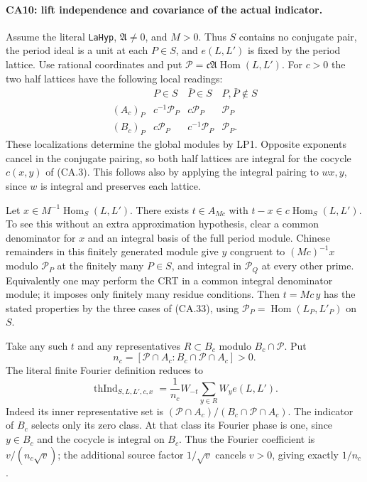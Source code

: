 \paragraph{CA10: lift independence and covariance of the actual indicator.}
Assume the literal \texttt{LaHyp}, $\mathfrak A\ne0$, and $M>0$.
Thus $S$ contains no conjugate pair, the period ideal is a unit at
each $P\in S$, and $e(L,L')$ is fixed by the period lattice.
Use rational coordinates and put
$\mathcal P=\mathfrak c\mathfrak A\operatorname{Hom}(L,L')$.
For $c>0$ the two half lattices have the following local readings:
\[
\begin{array}{c|ccc}
 &P\in S&\bar P\in S&P,\bar P\notin S\\ \hline
 (A_c)_P&c^{-1}\mathcal P_P&c\mathcal P_P&\mathcal P_P\\
 (B_c)_P&c\mathcal P_P&c^{-1}\mathcal P_P&\mathcal P_P.
\end{array}
 \tag{CA.33}
\]
These localizations determine the global modules by LP1. Opposite
exponents cancel in the conjugate pairing, so both half lattices
are integral for the cocycle $c(x,y)$ of (CA.3). This follows
also by applying the integral pairing to $wx,y$, since $w$ is
integral and preserves each lattice.

Let $x\in M^{-1}\operatorname{Hom}_S(L,L')$. There exists
$t\in A_{Mc}$ with $t-x\in c\operatorname{Hom}_S(L,L')$.
To see this without an extra approximation hypothesis, clear a
common denominator for $x$ and an integral basis of the full
period module. Chinese remainders in this finitely generated
module give $y$ congruent to $(Mc)^{-1}x$ modulo $\mathcal P_P$
at the finitely many $P\in S$, and integral in $\mathcal P_Q$
at every other prime. Equivalently one may perform the CRT in
a common integral denominator module; it imposes only finitely
many residue conditions. Then $t=Mc\,y$ has the stated properties
by the three cases of (CA.33), using
$\mathcal P_P=\operatorname{Hom}(L_P,L'_P)$ on $S$.

Take any such $t$ and any representatives
$R\subset B_c$ modulo $B_c\cap\mathcal P$. Put
\[
 n_c=[\mathcal P\cap A_c:B_c\cap\mathcal P\cap A_c]>0.
\]
The literal finite Fourier definition reduces to
\[
 \operatorname{thInd}_{S,L,L',c,x}
    =\frac1{n_c}W_{-t}\sum_{y\in R}W_y e(L,L').
 \tag{CA.34}
\]
Indeed its inner representative set is
$(\mathcal P\cap A_c)/(B_c\cap\mathcal P\cap A_c)$.
The indicator of $B_c$ selects only its zero class. At that
class its Fourier phase is one, since $y\in B_c$ and the
cocycle is integral on $B_c$. Thus the Fourier coefficient is
$v/(n_c\sqrt v)$; the additional source factor $1/\sqrt v$
cancels $v>0$, giving exactly $1/n_c$.


